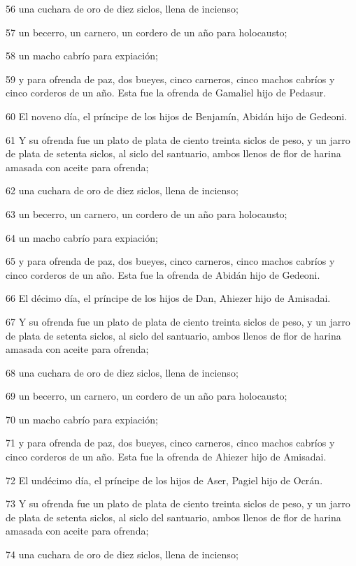 \par 56 una cuchara de oro de diez siclos,  llena de incienso;
\par 57 un becerro, un carnero, un cordero de un año para holocausto;
\par 58 un macho cabrío para expiación;
\par 59 y para ofrenda de paz, dos bueyes, cinco carneros, cinco machos cabríos y cinco corderos de un año. Esta fue la ofrenda de Gamaliel hijo de Pedasur.
\par 60 El noveno día, el príncipe de los hijos de Benjamín, Abidán hijo de Gedeoni.
\par 61 Y su ofrenda fue un plato de plata de ciento treinta siclos de peso,  y un jarro de plata de setenta siclos, al siclo del santuario, ambos llenos de flor de harina amasada con aceite para ofrenda;
\par 62 una cuchara de oro de diez siclos,  llena de incienso;
\par 63 un becerro, un carnero, un cordero de un año para holocausto;
\par 64 un macho cabrío para expiación;
\par 65 y para ofrenda de paz, dos bueyes, cinco carneros, cinco machos cabríos y cinco corderos de un año. Esta fue la ofrenda de Abidán hijo de Gedeoni.
\par 66 El décimo día, el príncipe de los hijos de Dan, Ahiezer hijo de Amisadai.
\par 67 Y su ofrenda fue un plato de plata de ciento treinta siclos de peso,  y un jarro de plata de setenta siclos, al siclo del santuario, ambos llenos de flor de harina amasada con aceite para ofrenda;
\par 68 una cuchara de oro de diez siclos,  llena de incienso;
\par 69 un becerro, un carnero, un cordero de un año para holocausto;
\par 70 un macho cabrío para expiación;
\par 71 y para ofrenda de paz, dos bueyes, cinco carneros, cinco machos cabríos y cinco corderos de un año. Esta fue la ofrenda de Ahiezer hijo de Amisadai.
\par 72 El undécimo día, el príncipe de los hijos de Aser, Pagiel hijo de Ocrán.
\par 73 Y su ofrenda fue un plato de plata de ciento treinta siclos de peso,  y un jarro de plata de setenta siclos, al siclo del santuario, ambos llenos de flor de harina amasada con aceite para ofrenda;
\par 74 una cuchara de oro de diez siclos,  llena de incienso;
